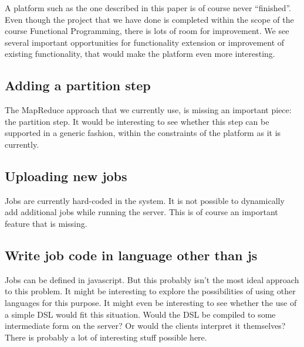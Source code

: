 A platform such as the one described in this paper is of course never
``finished''. Even though the project that we have done is completed within the
scope of the course Functional Programming, there is lots of room for improvement.
We see several important opportunities for functionality extension or improvement
of existing functionality, that would make the platform even more interesting.

\subsection{Adding a partition step}
The MapReduce approach that we currently use, is missing an important piece: the
partition step. It would be interesting to see whether this step can be supported
in a generic fashion, within the constraints of the platform as it is currently. 

\subsection{Uploading new jobs}
Jobs are currently hard-coded in the system. It is not possible to dynamically
add additional jobs while running the server. This is of course an important
feature that is missing.

\subsection{Write job code in language other than js}
Jobs can be defined in javascript. But this probably isn't the most ideal
approach to this problem. It might be interesting to explore the possibilities
of using other languages for this purpose. It might even be interesting to see
whether the use of a simple DSL would fit this situation. Would the DSL be
compiled to some intermediate form on the server? Or would the clients interpret
it themselves? There is probably a lot of interesting stuff possible here. 
